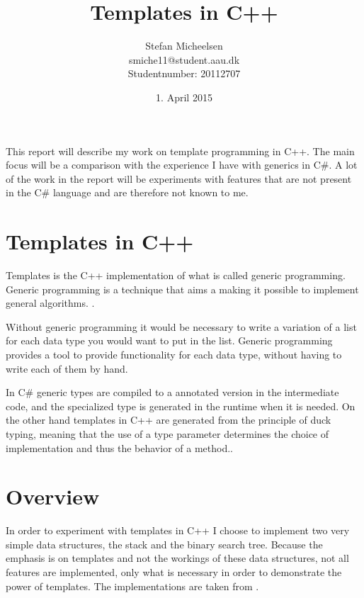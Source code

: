 


\title{Templates in C++ }
\author{Stefan Micheelsen \\smiche11@student.aau.dk \\Studentnumber: 20112707}
\date{1. April 2015}

\newcommand{\file}[1]
{
	\textit{\color{gray} ``#1''}
}





\maketitle

This report will describe my work on template programming in C++.
The main focus will be a comparison with the experience I have with generics in C\#.
A lot of the work in the report will be experiments with features that are not present in the C\# language and are therefore not known to me.


\section{Templates in C++}
Templates is the C++ implementation of what is called generic programming.
Generic programming is a technique that aims a making it possible to implement general algorithms. \cite[p.~700]{stroustrup2013c++}.

Without generic programming it would be necessary to write a variation of a list for each data type you would want to put in the list.
Generic programming provides a tool to provide functionality for each data type, without having to write each of them by hand.

In C\# generic types are compiled to a annotated version in the intermediate code, and the specialized type is generated in the runtime when it is needed\cite{genericruntime}.
On the other hand templates in C++ are generated from the principle of duck typing, meaning that the use of a type parameter determines the choice of implementation and thus the behavior of a method.\cite[p.~700]{stroustrup2013c++}.

\section{Overview}
In order to experiment with templates in C++ I choose to implement two very simple data structures, the stack and the binary search tree.
Because the emphasis is on templates and not the workings of these data structures, not all features are implemented, only what is necessary in order to demonstrate the power of templates.
The implementations are taken from \citet{algo}.

